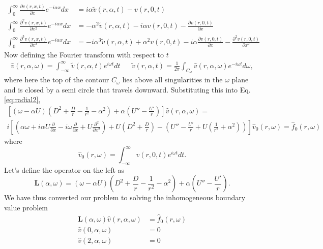 \documentclass[superscriptaddress, onecolumn, prl]{revtex4}
\begin{document}
\begin{equation}
\begin{split}
\int_0^\infty \frac{\partial v (r, x, t)}{\partial x} e^{-i \alpha x} dx &= i \alpha \tilde{v}(r, \alpha,t) - v (r, 0, t) \\
\int_0^\infty \frac{\partial^2 v (r, x, t)}{\partial x^2} e^{-i \alpha x} dx &= -\alpha^2 \tilde{v}(r, \alpha,t) - i \alpha v (r, 0, t) - \frac{\partial v(r, 0, t)}{\partial x} \\
\int_0^\infty \frac{\partial^3 v (r, x, t)}{\partial x^3} e^{-i \alpha x} dx &= - i \alpha^3 \tilde{v}(r, \alpha,t) + \alpha^2 v (r, 0, t) - i \alpha \frac{\partial v (r, 0, t) }{\partial x} - \frac{\partial^2 v (r, 0, t)}{\partial x^2}
\end{split}
\end{equation}
Now defining the Fourier transform with respect to $t$
\begin{align}
\hat{v}(r, \alpha, \omega) = \int_{-\infty}^{\infty} \tilde{v}(r, \alpha, t) e^{i \omega t} dt && \tilde{v}(r, \alpha, t) = \frac{1}{2 \pi} \int_{C_\omega} \hat{v} (r, \alpha, \omega) e^{-i \omega t} d \omega,
\end{align}
where here the top of the contour $C_\omega$ lies above all singularities in the $\omega$ plane and is closed by a semi circle that travels downward. Substituting this into Eq. \ref{eq:radial2},
\begin{multline}
\label{eq:radial3}
\left[ \left(\omega  - \alpha U \right) \left(D^2 + \frac{D}{r} - \frac{1}{r^2} - \alpha^2 \right) + \alpha \left( U'' - \frac{U'}{r} \right) \right] \hat{v} (r, \alpha, \omega) = \\ i \left[ \left(\alpha \omega + i \alpha U \frac{\partial}{\partial x} -i \omega \frac{\partial}{\partial x} + U \frac{\partial^2}{\partial x^2} \right)+ U( D^2 + \frac{D}{r}) - \left( U'' - \frac{U'}{r} + U \left(\frac{1}{r^2} + \alpha^2 \right) \right) \right] \hat{v}_0(r,\omega) = \hat{f}_0(r,\omega) 
\end{multline}
where 
\begin{equation}
\hat{v}_0(r, \omega) = \int_{-\infty}^{\infty} v(r, 0 , t) e^{i \omega t} dt.
\end{equation}
Let's define the operator on the left as 
\begin{equation}
\textbf{L}(\alpha, \omega) = \left( \omega  - \alpha U \right) \left(D^2 + \frac{D}{r} - \frac{1}{r^2} - \alpha^2 \right) + \alpha \left( U'' - \frac{U'}{r} \right).
\end{equation}
We have thus converted our problem to solving the inhomogeneous boundary value problem
\begin{equation}
\begin{split}
\textbf{L}(\alpha, \omega) \hat{v} (r, \alpha, \omega) &= \hat{f}_0(r,\omega) \\
\hat{v} (0, \alpha, \omega) &= 0 \\
\hat{v} (2, \alpha, \omega) &= 0
\end{split}
\end{equation}
\end{document}
